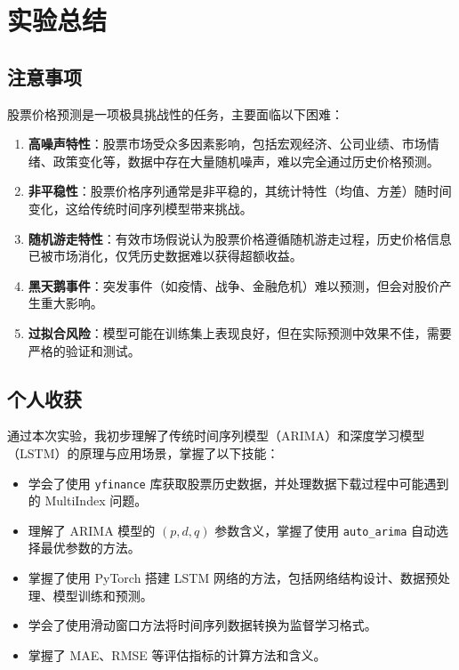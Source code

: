 \documentclass[a4paper]{article}
\begin{document}
\section{实验总结}

\subsection{注意事项}
股票价格预测是一项极具挑战性的任务，主要面临以下困难：
\begin{enumerate}
    \item \textbf{高噪声特性}：股票市场受众多因素影响，包括宏观经济、公司业绩、市场情绪、政策变化等，数据中存在大量随机噪声，难以完全通过历史价格预测。
    \item \textbf{非平稳性}：股票价格序列通常是非平稳的，其统计特性（均值、方差）随时间变化，这给传统时间序列模型带来挑战。
    \item \textbf{随机游走特性}：有效市场假说认为股票价格遵循随机游走过程，历史价格信息已被市场消化，仅凭历史数据难以获得超额收益。
    \item \textbf{黑天鹅事件}：突发事件（如疫情、战争、金融危机）难以预测，但会对股价产生重大影响。
    \item \textbf{过拟合风险}：模型可能在训练集上表现良好，但在实际预测中效果不佳，需要严格的验证和测试。
\end{enumerate}

\subsection{个人收获}
通过本次实验，我初步理解了传统时间序列模型（ARIMA）和深度学习模型（LSTM）的原理与应用场景，掌握了以下技能：
\begin{itemize}
    \item 学会了使用 \texttt{yfinance} 库获取股票历史数据，并处理数据下载过程中可能遇到的 MultiIndex 问题。
    \item 理解了 ARIMA 模型的 $(p, d, q)$ 参数含义，掌握了使用 \texttt{auto\_arima} 自动选择最优参数的方法。
    \item 掌握了使用 PyTorch 搭建 LSTM 网络的方法，包括网络结构设计、数据预处理、模型训练和预测。
    \item 学会了使用滑动窗口方法将时间序列数据转换为监督学习格式。
    \item 掌握了 MAE、RMSE 等评估指标的计算方法和含义。
\end{itemize}
\end{document}
